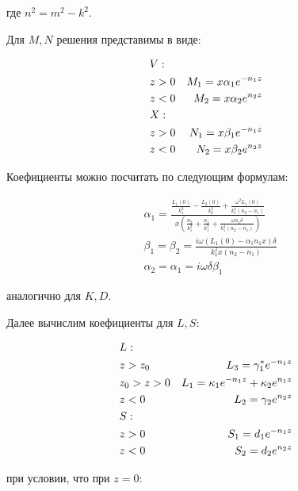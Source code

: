 	где $n^2 = m^2 - k^2$.
	
	Для $M, N$ решения представимы в виде:
	
	\begin{equation}
		\begin{aligned}
			&V: \\
			& z > 0 \space 	&M_1 = x\alpha_1 e^{-n_1z} \\
			& z < 0 \space	&M_2 = x\alpha_2 e^{n_2z} \\
			&X: \\
			& z > 0 \space	&N_1 = x\beta_1 e^{-n_1z} \\
			& z < 0	\space	&N_2 = x\beta_2 e^{n_2z} 
		\end{aligned}
	\end{equation}
	
	Коефициенты можно посчитать по следующим формулам:
	
	\begin{equation}
		\begin{aligned}
			&\alpha_1 = \frac{\frac{L_1(0)}{k_1^2} - \frac{L_2(0)}{k_2^2} + \frac{\omega^2 L_1(0)}{k_1^4 (n_2 - n_1)}}{x(\frac{n_2}{k_1^2} + \frac{n_1}{k_1^2} + \frac{\omega n_1 \delta}{k_1^4 (n_2 - n_1)})} \\
			&\beta_1 = \beta_2 = \frac{i \omega (L_1(0) - \alpha_1 n_1 x) \delta}{k_1^2 x (n_2 - n_1)} \\
			&\alpha_2 = \alpha_1 = i \omega \delta \beta_1		
		\end{aligned}
	\end{equation}
	
	аналогично для $K, D$.
	
	Далее вычислим коефициенты для $L, S$:
	
	\begin{equation}
		\begin{aligned}
			&L: \\
			& z > z_0 \space 	&L_3 = \gamma_1^* e^{-n_1z} \\
			& z_0 > z > 0 \space	 &L_1 = \kappa_1 e^{-n_1z} + \kappa_2 e^{n_1z} \\
			& z < 0 \space	&L_2 =  \gamma_2 e^{n_2z} \\
			&S: \\
			& z > 0 \space	&S_1 = d_1 e^{-n_1z} \\
			& z < 0	\space	&S_2 = d_2 e^{n_2z} 
		\end{aligned}
	\end{equation}
	
	при условии, что  при $z = 0$:
	

